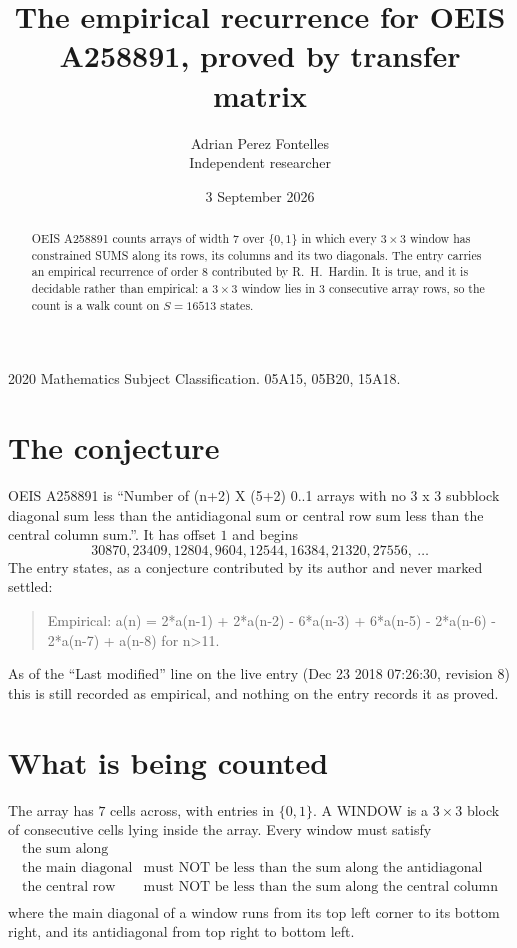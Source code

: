 \documentclass[11pt,a4paper]{article}
\title{The empirical recurrence for OEIS A258891, proved by transfer matrix}
\author{Adrian Perez Fontelles\\ \small Independent researcher}
\date{3 September 2026}
\theoremstyle{plain}
\theoremstyle{definition}
\begin{document}
\maketitle

\begin{abstract}
OEIS A258891 counts arrays of width $7$ over $\{0,1\}$ in which every $3\times3$ window has
constrained SUMS along its rows, its columns and its two diagonals. The entry carries an
empirical recurrence of order $8$ contributed by R.~H.~Hardin. It is true, and it is
decidable rather than empirical: a $3\times3$ window lies in $3$ consecutive array rows,
so the count is a walk count on $S=16513$ states.
\end{abstract}

\noindent\small 2020 Mathematics Subject Classification. 05A15, 05B20, 15A18.\normalsize

\section{The conjecture}

OEIS A258891 is ``Number of (n+2) X (5+2) 0..1 arrays with no 3 x 3 subblock diagonal sum less than the antidiagonal sum or central row sum less than the central column sum.''. It has offset $1$ and begins
\[
30870, 23409, 12804, 9604, 12544, 16384, 21320, 27556,\ \dots
\]
The entry states, as a conjecture contributed by its author and never marked settled:
\begin{quote}
Empirical: a(n) = 2*a(n-1) + 2*a(n-2) - 6*a(n-3) + 6*a(n-5) - 2*a(n-6) - 2*a(n-7) + a(n-8) for n>11.
\end{quote}
As of the ``Last modified'' line on the live entry (Dec 23 2018 07:26:30, revision 8) this is still
recorded as empirical, and nothing on the entry records it as proved.

\section{What is being counted}

The array has $7$ cells across, with entries in $\{0,1\}$. A WINDOW is a $3\times3$ block
of consecutive cells lying inside the array. Every window must satisfy
\[
\begin{array}{ll}
\text{the sum along} & \text{} \\[2pt]
\text{the main diagonal} & \text{must NOT be less than the sum along the antidiagonal} \\
\text{the central row} & \text{must NOT be less than the sum along the central column} \\
\end{array}
\]
where the main diagonal of a window runs from its top left corner to its bottom right, and its
antidiagonal from top right to bottom left.
\end{document}
